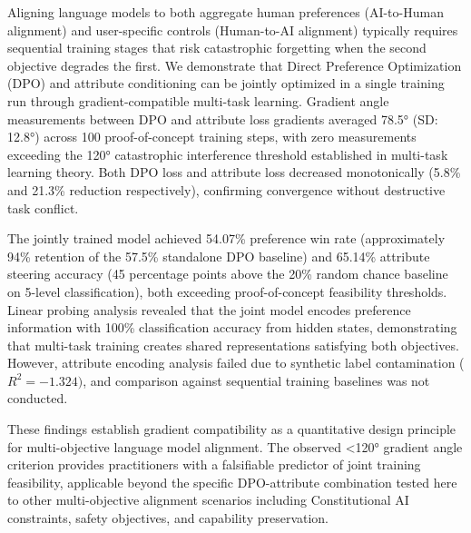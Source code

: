 
Aligning language models to both aggregate human preferences (AI-to-Human alignment) and user-specific controls (Human-to-AI alignment) typically requires sequential training stages that risk catastrophic forgetting when the second objective degrades the first. We demonstrate that Direct Preference Optimization (DPO) and attribute conditioning can be jointly optimized in a single training run through gradient-compatible multi-task learning. Gradient angle measurements between DPO and attribute loss gradients averaged 78.5° (SD: 12.8°) across 100 proof-of-concept training steps, with zero measurements exceeding the 120° catastrophic interference threshold established in multi-task learning theory. Both DPO loss and attribute loss decreased monotonically (5.8\% and 21.3\% reduction respectively), confirming convergence without destructive task conflict.

The jointly trained model achieved 54.07\% preference win rate (approximately 94\% retention of the 57.5\% standalone DPO baseline) and 65.14\% attribute steering accuracy (45 percentage points above the 20\% random chance baseline on 5-level classification), both exceeding proof-of-concept feasibility thresholds. Linear probing analysis revealed that the joint model encodes preference information with 100\% classification accuracy from hidden states, demonstrating that multi-task training creates shared representations satisfying both objectives. However, attribute encoding analysis failed due to synthetic label contamination ($R^{2}=-1.324)$, and comparison against sequential training baselines was not conducted.

These findings establish gradient compatibility as a quantitative design principle for multi-objective language model alignment. The observed <120° gradient angle criterion provides practitioners with a falsifiable predictor of joint training feasibility, applicable beyond the specific DPO-attribute combination tested here to other multi-objective alignment scenarios including Constitutional AI constraints, safety objectives, and capability preservation.
